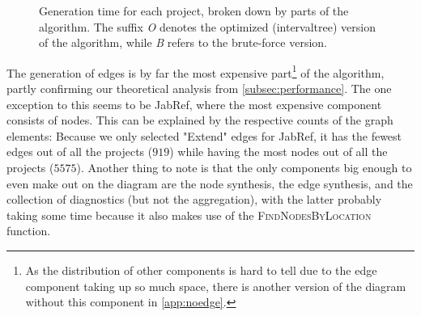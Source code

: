 \documentclass[../thesis]{subfiles}
\begin{document}
\begin{figure}
\begin{subfigure}[T]{0.5\textwidth}
\begin{center}
		\end{center}
	\end{subfigure}
	\caption{Generation time for each project, broken down by parts of the algorithm.
		The suffix \emph{O} denotes the optimized (\gls{intervaltree}) version of the algorithm, while \emph{B} refers to the brute-force version.
	}\label{fig:techeval}
\end{figure}

The generation of edges is by far the most expensive part\footnote{
	As the distribution of other components is hard to tell due to the edge component taking up so much space, there is another version of the diagram without this component in \cref{app:noedge}.
} of the algorithm, partly confirming our theoretical analysis from \cref{subsec:performance}.
The one exception to this seems to be JabRef, where the most expensive component consists of nodes.
This can be explained by the respective counts of the graph elements:
Because we only selected "Extend" edges for JabRef, it has the fewest edges out of all the projects ($919$) while having the most nodes out of all the projects ($5575$).
Another thing to note is that the only components big enough to even make out on the diagram are the node synthesis, the edge synthesis, and the collection of diagnostics (but not the aggregation), with the latter probably taking some time because it also makes use of the \textsc{FindNodesByLocation} function.
\end{document}
